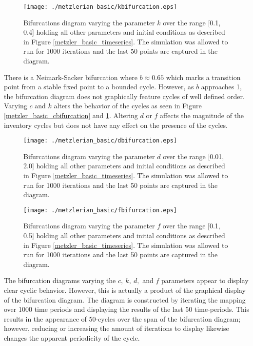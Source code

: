 \begin{figure}
    \centering
    \texttt{[image: ./metzlerian\_basic/kbifurcation.eps]}
    \caption{Bifurcations diagram varying the parameter $k$ over the range [0.1, 0.4] holding all other parameters and initial conditions as described in Figure \ref{metzler_basic_timeseries}. The simulation was allowed to run for 1000 iterations and the last 50 points are captured in the diagram.}
    \label{metzler_basic_kbifurcation}
\end{figure} 

There is a Neimark-Sacker bifurcation where $b\approx0.65$ which marks a transition point from a stable fixed point to a bounded cycle. However, as $b$ approaches 1, the bifurcation diagram does not graphically feature cycles of well defined order. Varying $c$ and $k$ alters the behavior of the cycles as seen in Figure \ref{metzler_basic_cbifurcation} and \ref{metzler_basic_kbifurcation}. Altering $d$ or $f$ affects the magnitude of the inventory cycles but does not have any effect on the presence of the cycles.

\begin{figure}
    \centering
    \texttt{[image: ./metzlerian\_basic/dbifurcation.eps]}
    \caption{Bifurcations diagram varying the parameter $d$ over the range [0.01, 2.0] holding all other parameters and initial conditions as described in Figure \ref{metzler_basic_timeseries}. The simulation was allowed to run for 1000 iterations and the last 50 points are captured in the diagram.}
    \label{metzler_basic_dbifurcation}
\end{figure} 

\begin{figure}
    \centering
    \texttt{[image: ./metzlerian\_basic/fbifurcation.eps]}
    \caption{Bifurcations diagram varying the parameter $f$ over the range [0.1, 0.5] holding all other parameters and initial conditions as described in Figure \ref{metzler_basic_timeseries}. The simulation was allowed to run for 1000 iterations and the last 50 points are captured in the diagram.}
    \label{metzler_basic_fbifurcation}
\end{figure}

The bifurcation diagrams varying the $c,\ k,\ d,$ and $f$ parameters appear to display clear cyclic behavior. However, this is actually a product of the graphical display of the bifurcation diagram. The diagram is constructed by iterating the mapping over 1000 time periods and displaying the results of the last 50 time-periods. This results in the appearance of 50-cycles over the span of the bifurcation diagram; however, reducing or increasing the amount of iterations to display likewise changes the apparent periodicity of the cycle.

